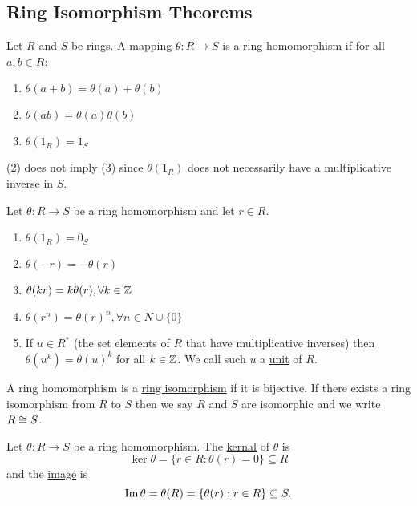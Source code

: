 \documentclass[11pt]{article}
\begin{document}
\subsection{Ring Isomorphism Theorems}

\begin{definition}
    Let $R$ and $S$ be rings. A mapping $\theta:R\to S$ is a \ul{ring homomorphism} if for all $a,b\in R$:
    \begin{enumerate}
        \item $\theta(a+b)=\theta(a)+\theta(b)$
        \item $\theta(ab)=\theta(a)\theta(b)$
        \item $\theta(1_R)=1_S$
    \end{enumerate}
\end{definition}

\begin{remark}
    (2) does not imply (3) since $\theta(1_R)$ does not necessarily have a multiplicative inverse in $S$.
\end{remark}

\begin{proposition}
    Let $\theta:R\to S$ be a ring homomorphism and let $r\in R$.
    \begin{enumerate}
        \item $\theta(1_R)=0_S$
        \item $\theta(-r)=-\theta(r)$
        \item $\theta(kr)=k\theta(r),\forall k\in\mathbb{Z}$
        \item $\theta(r^n)=\theta(r)^n,\forall n\in N\cup\{0\}$
        \item If $u\in R^*$ (the set elements of $R$ that have multiplicative inverses) then $\theta(u^k)=\theta(u)^k$ for all $k\in\mathbb{Z}$. We call such $u$ a \ul{unit} of $R$.
    \end{enumerate}
\end{proposition}

\begin{definition}
    A ring homomorphism is a \ul{ring isomorphism} if it is bijective. If there exists a ring isomorphism from $R$ to $S$ then we say $R$ and $S$ are isomorphic and we write $R\cong S$.
\end{definition}

\begin{definition}
    Let $\theta:R\to S$ be a ring homomorphism. The \ul{kernal} of $\theta$ is
    \[\ker\theta=\{r\in R:\theta(r)=0\}\subseteq R\]
    and the \ul{image} is
    \[\operatorname{Im}\theta=\theta(R)=\{\theta(r):r\in R\}\subseteq S.\]
\end{definition}
\end{document}
